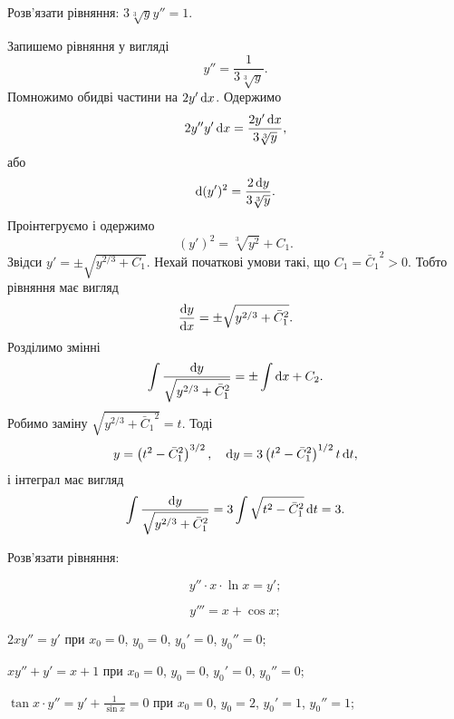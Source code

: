 \begin{example}
	Розв’язати рівняння: $3 \sqrt[3]{y} y'' = 1$.
\end{example}
\begin{solution}
	Запишемо рівняння у вигляді \[ y'' = \frac{1}{3\sqrt[3]{y}}. \] Помножимо обидві частини на $2 y' \mathop{}\!\mathrm{d} x$. Одержимо \[ 2 y'' y' \mathop{}\!\mathrm{d} x = \frac{2y'\mathop{}\!\mathrm{d} x}{3\sqrt[3]{y}}, \] або \[ \mathop{}\!\mathrm{d} (y')^2 = \frac{2\mathop{}\!\mathrm{d} y}{3\sqrt[3]{y}}. \] Проінтегруємо і одержимо \[ (y')^2 = \sqrt[3]{y^2} + C_1.\] Звідси $y' = \pm \sqrt{y^{2/3} + C_1}$. Нехай початкові умови такі, що $C_1 = {\bar C_1}^2 > 0$. Тобто рівняння має вигляд \[ \frac{\mathop{}\!\mathrm{d} y}{\mathop{}\!\mathrm{d} x} = \pm \sqrt{y^{2/3} + {\bar C_1}^2}. \] Розділимо змінні \[ \int \frac{\mathop{}\!\mathrm{d} y}{\sqrt{y^{2/3} + {\bar C_1}^2}} = \pm \int \mathop{}\!\mathrm{d} x + C_2. \] Робимо заміну $\sqrt{y^{2/3} + {\bar C_1}^2} = t$. Тоді \[ y = \left(t^2 - {\bar C_1}^2\right)^{3/2}, \quad \mathop{}\!\mathrm{d} y = 3 \left(t^2 - {\bar C_1}^2\right)^{1/2} t \mathop{}\!\mathrm{d} t,\]	і інтеграл має вигляд \[ \int \frac{\mathop{}\!\mathrm{d} y}{\sqrt{y^{2/3} + {\bar C_1}^2}}=3\int \sqrt{t^2 - {\bar C_1}^2} \mathop{}\!\mathrm{d} t = 3.\]
\end{solution}
Розв’язати рівняння:
\begin{multicols}{2}
\begin{problem}
	\[ y'' \cdot x \cdot \ln x = y';\]
\end{problem}
\begin{problem}
	\[y''' = x + \cos x;\]
\end{problem}
\end{multicols}
\begin{problem}
	$2 x y'' = y'$ при $x_0 = 0$, $y_0 = 0$, $y_0' = 0$, $y_0'' = 0$;
\end{problem}
\begin{problem}
	$x y'' + y' = x + 1$ при $x_0 = 0$, $y_0 = 0$, $y_0' = 0$, $y_0'' = 0$;
\end{problem}
\begin{problem}
	$\tan x \cdot y'' = y' + \frac{1}{\sin x} = 0$ при $x_0 = 0$, $y_0 = 2$, $y_0' = 1$, $y_0'' = 1$;
\end{problem}
